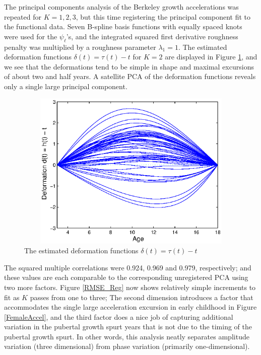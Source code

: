 \documentclass[12pt]{article}
\begin{document}
The principal components analysis of the Berkeley growth accelerations was repeated for $K = 1,2,3$, but this time registering the principal component fit to the functional data.  Seven B-spline basis functions with equally spaced knots were used for the $\psi_\ell$'s, and the integrated squared first derivative roughness penalty was multiplied by a roughness parameter $\lambda_1 = 1.$ The estimated deformation functions $\delta(t) = \tau(t) - t$ for $K=2$ are displayed in Figure \ref{Deform_2}, and we see that the deformations tend to be simple in shape and maximal excursions of about two and half years.  A satellite PCA of the deformation functions reveals only a single large principal component.

\begin{figure}
  \includegraphics[height=3in, width=5in]{figs/Deform_2}
  \caption{The estimated deformation functions $\delta(t) = \tau(t) - t$}
  \label{Deform_2}
\end{figure}

The squared multiple correlations were 0.924, 0.969 and 0.979, respectively; and these values are each comparable to the corresponding unregistered PCA using two more factors.  Figure \ref{RMSE_Reg} now shows relatively simple increments to fit as $K$ passes from one to three;  The second dimension introduces a factor that accommodates the single large acceleration excursion in early childhood in Figure \ref{FemaleAccel}, and the third factor does a nice job of capturing additional variation in the pubertal growth spurt years that is not due to the timing of the pubertal growth spurt.  In other words, this analysis neatly separates amplitude variation (three dimensional) from phase variation (primarily one-dimensional).
\end{document}
